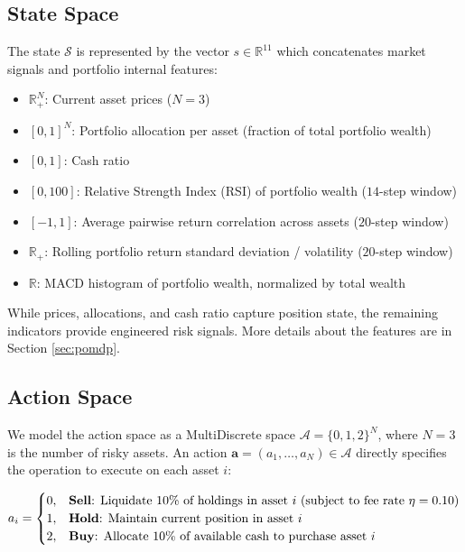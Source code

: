 \documentclass[pdflatex,sn-mathphys-num]{sn-jnl}
\begin{document}
\subsection{State Space}
The state $\mathcal{S}$ is represented by the vector $s \in \mathbb{R}^{11}$ which concatenates market signals and portfolio internal features:
\begin{itemize}
    \item $\mathbb{R}_+^N$: Current asset prices ($N = 3$)
    \item $[0,1]^N$: Portfolio allocation per asset (fraction of total portfolio wealth)
    \item $[0,1]$: Cash ratio
    \item $[0,100]$: Relative Strength Index (RSI) \cite{wilder1978new} of portfolio wealth ($14$-step window)
    \item $[-1,1]$: Average pairwise return correlation across assets ($20$-step window)
    \item $\mathbb{R}_+$: Rolling portfolio return standard deviation / volatility ($20$-step window)
    \item $\mathbb{R}$: MACD \cite{appel2005technical} histogram of portfolio wealth, normalized by total wealth
\end{itemize}
While prices, allocations, and cash ratio capture position state, the remaining indicators provide engineered risk signals.
More details about the features are in Section \ref{sec:pomdp}.
\subsection{Action Space}
We model the action space as a MultiDiscrete space $\mathcal{A} = \{0, 1, 2\}^N$, where $N = 3$ is the number of risky assets. An action $\mathbf{a} = (a_1, \dots, a_N) \in \mathcal{A}$ directly specifies the operation to execute on each asset $i$:

\begin{equation}
    a_i = 
    \begin{cases}
        0, & \text{\textbf{Sell}: Liquidate $10\%$ of holdings in asset } i \text{ (subject to fee rate } \eta = 0.10\text{)} \\
        1, & \text{\textbf{Hold}: Maintain current position in asset } i \\
        2, & \text{\textbf{Buy}: Allocate $10\%$ of available cash to purchase asset } i
    \end{cases}
\end{equation}
\end{document}

